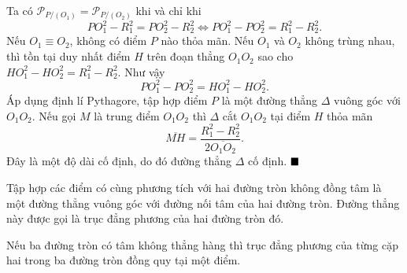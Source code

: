 \documentclass{article} %
\newenvironment{solution}[1][Lời giải]{%
  \proof[\faPenNib \hspace{0.2cm} \ttfamily \scshape \large #1]%
}{\(\hfill \blacksquare\){\parfillskip0pt\par}}
\begin{document}
        \begin{solution}
            Ta có \(\mathcal{P}_{P/(O_1)} = \mathcal{P}_{P/(O_2)}\) khi và chỉ khi
            \[PO_1^2 - R_1^2 = PO_2^2 - R_2^2 \Leftrightarrow PO_1^2 - PO_2^2 = R_1^2 - R_2^2.\]
            Nếu \(O_1 \equiv O_2\), không có điểm \(P\) nào thỏa mãn. Nếu \(O_1\) và \(O_2\) không trùng nhau, thì tồn tại duy nhất điểm \(H\) trên đoạn thẳng \(O_1O_2\) sao cho \(HO_1^2 - HO_2^2 = R_1^2 - R_2^2\). Như vậy
            \[PO_1^2 - PO_2^2 = HO_1^2 - HO_2^2.\]
            Áp dụng định lí Pythagore, tập hợp điểm \(P\) là một đường thẳng \(\Delta\) vuông góc với \(O_1O_2\). Nếu gọi \(M\) là trung điểm \(O_1O_2\) thì \(\Delta\) cắt \(O_1O_2\) tại điểm \(H\) thỏa mãn
            \[\overline{MH} = \frac{R_1^2 - R_2^2}{2\overline{O_1O_2}}.\]
            Đây là một độ dài cố định, do đó đường thẳng \(\Delta\) cố định.
        \end{solution}
    
        \begin{definition}
            Tập hợp các điểm có cùng phương tích với hai đường tròn không đồng tâm là một đường thẳng vuông góc với đường nối tâm của hai đường tròn. Đường thẳng này được gọi là trục đẳng phương của hai đường tròn đó.
        \end{definition}
    
        \begin{theorem}
            Nếu ba đường tròn có tâm không thẳng hàng thì trục đẳng phương của từng cặp hai trong ba đường tròn đồng quy tại một điểm.
        \end{theorem}
    
\end{document}
